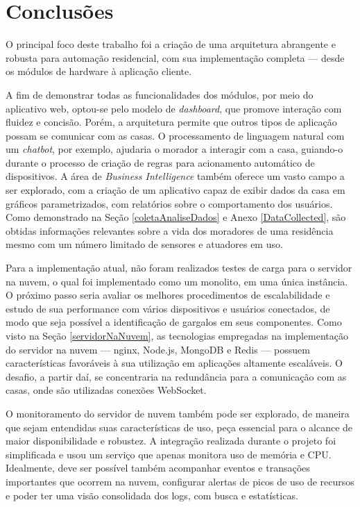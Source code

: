 \chapter{Conclusões}

O principal foco deste trabalho foi a criação de uma arquitetura abrangente e robusta para automação residencial, com sua implementação completa --- desde os módulos de hardware à aplicação cliente.

A fim de demonstrar todas as funcionalidades dos módulos, por meio do aplicativo web, optou-se pelo modelo de \textit{dashboard}, que promove interação com fluidez e concisão. Porém, a arquitetura permite que outros tipos de aplicação possam se comunicar com as casas. O processamento de linguagem natural com um \textit{chatbot}, por exemplo, ajudaria o morador a interagir com a casa, guiando-o durante o processo de criação de regras para acionamento automático de dispositivos. A área de \textit{Business Intelligence} também oferece um vasto campo a ser explorado, com a criação de um aplicativo capaz de exibir dados da casa em gráficos parametrizados, com relatórios sobre o comportamento dos usuários. Como demonstrado na Seção \ref{coletaAnaliseDados} e Anexo \ref{DataCollected}, são obtidas informações relevantes sobre a vida dos moradores de uma residência mesmo com um número limitado de sensores e atuadores em uso.

Para a implementação atual, não foram realizados testes de carga para o servidor na nuvem, o qual foi  implementado como um monolito, em uma única instância. O próximo passo seria avaliar os melhores procedimentos de escalabilidade e estudo de sua performance com vários dispositivos e usuários conectados, de modo que seja possível a identificação de gargalos em seus componentes. Como visto na Seção \ref{servidorNaNuvem}, as tecnologias empregadas na implementação do servidor na nuvem --- nginx, Node.js, MongoDB e Redis --- possuem características favoráveis à sua utilização em aplicações altamente escaláveis.  O desafio, a partir daí, se concentraria na redundância para a comunicação com as casas, onde são utilizadas conexões WebSocket.

O monitoramento do servidor de nuvem também pode ser explorado, de maneira que sejam entendidas suas características de uso, peça essencial para o alcance de maior disponibilidade e robustez. A integração realizada durante o projeto foi simplificada e usou um serviço que apenas monitora uso de memória e CPU. Idealmente, deve ser possível também acompanhar eventos e transações importantes que ocorrem na nuvem, configurar alertas de picos de uso de recursos e poder ter uma visão consolidada dos logs, com busca e estatísticas.

